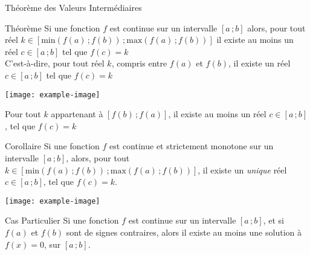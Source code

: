 \documentclass{cours}
\begin{document}
    \hspace{4ex}

    \begin{Gpartie}{Théorème des Valeurs Intermédiaires}
        \begin{Spartie}{Théorème}
            Si une fonction $f$ est continue sur un intervalle $[a\,;b]$ alors, pour tout réel $k\in[\text{min}(f(a)\,;f(b))\,;\text{max}(f(a)\,;f(b))]$ il existe au moins un réel $c\in[a\,;b]$ tel que $f(c)=k$ \\
            C'est-à-dire, pour tout réel $k$, compris entre $f(a)$ et $f(b)$, il existe un réel $c\in[a\,;b]$ tel que $f(c)=k$
            \begin{center}
                    \noindent\texttt{[image: example-image]}
                    \parbox{\linewidth}{}
            \end{center}
            Pour tout $k$ appartenant à $[f(b)\,;f(a)]$, il existe au moins un réel $c\in[a\,;b]$, tel que $f(c)=k$
        \end{Spartie}
        \begin{Spartie}{Corollaire}
            Si une fonction $f$ est continue et strictement monotone sur un intervalle $[a\,;b]$, alors, pour tout $k\in[\text{min}(f(a)\,;f(b))\,;\text{max}(f(a)\,;f(b))]$, il existe un {\it unique} réel $c\in[a\,;b]$, tel que $f(c)=k$. 
            \begin{center}
                    \noindent\texttt{[image: example-image]}
                    \parbox{\linewidth}{}
            \end{center}
            \begin{SSpartie}{Cas Particulier}
                Si une fonction $f$ est continue sur un intervalle $[a\,;b]$, et si $f(a)$ et $f(b)$ sont de signes contraires, alors il existe au moins une solution à $f(x)=0$, sur $[a\,;b]$.
            \end{SSpartie}
        \end{Spartie}
    \end{Gpartie}
\end{document}
